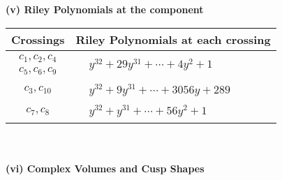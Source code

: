 \documentclass[1p]{elsarticle_modified}
\theoremstyle{definition}
\begin{document}
\newpage\renewcommand{\arraystretch}{1}
\flushleft \textbf{(v) Riley Polynomials at the component}\newline \\
\begin{tabular}{m{50pt}|m{274pt}}
Crossings & \hspace{64pt}Riley Polynomials at each crossing \\
\hline $$\begin{aligned}c_{1},c_{2},c_{4}\\c_{5},c_{6},c_{9}\end{aligned}$$&$\begin{aligned}
&y^{32}+29 y^{31}+\cdots+4 y^2+1
\end{aligned}$\\
\hline $$\begin{aligned}c_{3},c_{10}\end{aligned}$$&$\begin{aligned}
&y^{32}+9 y^{31}+\cdots+3056 y+289
\end{aligned}$\\
\hline $$\begin{aligned}c_{7},c_{8}\end{aligned}$$&$\begin{aligned}
&y^{32}+y^{31}+\cdots+56 y^2+1
\end{aligned}$\\
\hline
\end{tabular}\\~\\
\newpage\flushleft \textbf{(vi) Complex Volumes and Cusp Shapes}
\end{document}
